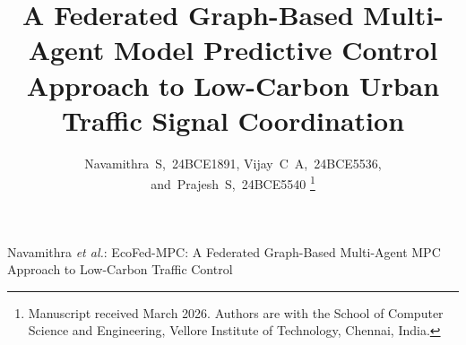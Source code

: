 \documentclass[journal]{IEEEtran}
\begin{document}
\title{A Federated Graph-Based Multi-Agent Model Predictive Control\\
       Approach to Low-Carbon Urban Traffic Signal Coordination}

\author{Navamithra~S,~24BCE1891,\;
        Vijay~C~A,~24BCE5536,\;
        and~Prajesh~S,~24BCE5540%
\thanks{Manuscript received March 2026. Authors are with the School of
Computer Science and Engineering, Vellore Institute of Technology,
Chennai, India.}}

%
{Navamithra \MakeLowercase{\textit{et al.}}: EcoFed-MPC: A Federated Graph-Based
Multi-Agent MPC Approach to Low-Carbon Traffic Control}

\maketitle
\end{document}
